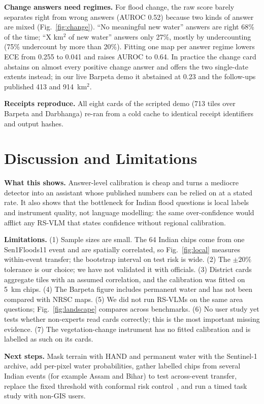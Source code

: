 \documentclass[conference]{IEEEtran}
\begin{document}
\textbf{Change answers need regimes.} For flood change, the raw score barely separates right from wrong answers (AUROC 0.52) because two kinds of answer are mixed (Fig.~\ref{fig:change}). ``No meaningful new water'' answers are right 68\% of the time; ``X km$^2$ of new water'' answers only 27\%, mostly by undercounting (75\% undercount by more than 20\%). Fitting one map per answer regime lowers ECE from 0.255 to 0.041 and raises AUROC to 0.64. In practice the change card abstains on almost every positive change answer and offers the two single-date extents instead; in our live Barpeta demo it abstained at 0.23 and the follow-ups published 413 and 914~km$^2$.

\textbf{Receipts reproduce.} All eight cards of the scripted demo (713 tiles over Barpeta and Darbhanga) re-ran from a cold cache to identical receipt identifiers and output hashes.

\section{Discussion and Limitations}

\textbf{What this shows.} Answer-level calibration is cheap and turns a mediocre detector into an assistant whose published numbers can be relied on at a stated rate. It also shows that the bottleneck for Indian flood questions is local labels and instrument quality, not language modelling: the same over-confidence would afflict any RS-VLM that states confidence without regional calibration.

\textbf{Limitations.} (1) Sample sizes are small. The 64 Indian chips come from one Sen1Floods11 event and are spatially correlated, so Fig.~\ref{fig:local} measures within-event transfer; the bootstrap interval on test risk is wide. (2) The $\pm20\%$ tolerance is our choice; we have not validated it with officials. (3) District cards aggregate tiles with an assumed correlation, and the calibration was fitted on 5~km chips. (4) The Barpeta figure includes permanent water and has not been compared with NRSC maps. (5) We did not run RS-VLMs on the same area questions; Fig.~\ref{fig:landscape} compares across benchmarks. (6) No user study yet tests whether non-experts read cards correctly; this is the most important missing evidence. (7) The vegetation-change instrument has no fitted calibration and is labelled as such on its cards.

\textbf{Next steps.} Mask terrain with HAND and permanent water with the Sentinel-1 archive, add per-pixel water probabilities, gather labelled chips from several Indian events (for example Assam and Bihar) to test across-event transfer, replace the fixed threshold with conformal risk control~\cite{angelopoulos2024risk}, and run a timed task study with non-GIS users.
\end{document}
